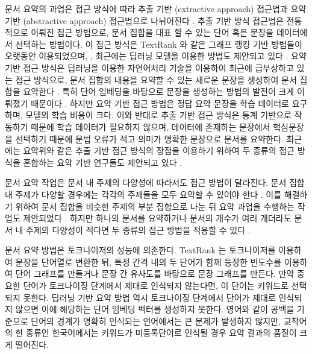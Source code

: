\documentclass[oneside, ko,phd]{snuthesis_utf8_kor}
\begin{document}
문서 요약의 과업은 접근 방식에 따라 추출 기반 (extractive approach) 접근법과 요약 기반 (abstractive approach) 접근법으로 나뉘어진다 \cite{yao2017recent}.
추출 기반 방식 접근법은 전통적으로 이뤄진 접근 방법으로, 문서 집합을 대표 할 수 있는 단어 혹은 문장을 데이터에서 선택하는 방법이다.
이 접근 방식은 TextRank \cite{mihalcea2004textrank} 와 같은 그래프 랭킹 기반 방법들이 오랫동안 이용되었으며,  \cite{parveen2015topical, narayan2018ranking}, 최근에는 딥러닝 모델을 이용한 방법도 제안되고 있다 \cite{rush2015neural}.
요약 기반 접근 방식은 딥러닝을 이용한 자연어처리 기술을 이용하여 최근에 급부상하고 있는 접근 방식으로, 문서 집합의 내용을 요약할 수 있는 새로운 문장을 생성하여 문서 집합을 요약한다 \cite{nallapati2016abstractive}.
특히 단어 임베딩을 바탕으로 문장을 생성하는 방법의 발전이 크게 이뤄졌기 때문이다 \cite{bengio2003neural, donahue2015long, xu2015show, nallapati2016abstractive}.
하지만 요약 기반 접근 방법은 정답 요약 문장을 학습 데이터로 요구하며, 모델의 학습 비용이 크다.
이와 반대로 추출 기반 접근 방식은 통계 기반으로 작동하기 때문에 학습 데이터가 필요하지 않으며, 데이터에 존재하는 문장에서 핵심문장을 선택하기 때문에 문법 오류가 적고 의미가 명확한 문장으로 문서를 요약한다.
최근에는 요약위와 같은 추출 기반 접근 방식의 장점을 이용하기 위하여 두 종류의 접근 방식을 혼합하는 요약 기반 연구들도 제안되고 있다 \cite{banerjee2015multi, bing2015abstractive, gu2016incorporating}.

문서 요약 작업은 문서 내 주제의 다양성에 따라서도 접근 방법이 달라진다.
문서 집합 내 주제가 다양할 경우에는 각각의 주제들을 모두 요약할 수 있어야 한다 \cite{yao2017recent}.
이를 해결하기 위하여 문서 집합을 비슷한 주제의 부분 집합으로 나눈 뒤 요약 과업을 수행하는 작업도 제안되었다 \cite{filippova2008sentence, filippova2010multi}.
하지만 하나의 문서를 요약하거나 문서의 개수가 여러 개더라도 문서 내 주제의 다양성이 적다면 두 종류의 접근 방법을 적용할 수 있다 \cite{goldstein2000multi, lin2002single}.

문서 요약 방법은 토크나이저의 성능에 의존한다.
TextRank 는 토크나이저를 이용하여 문장을 단어열로 변환한 뒤, 특정 간격 내의 두 단어가 함께 등장한 빈도수를 이용하여 단어 그래프를 만들거나 문장 간 유사도를 바탕으로 문장 그래프를 만든다.
만약 중요한 단어가 토크나이징 단계에서 제대로 인식되지 않는다면, 이 단어는 키워드로 선택되지 못한다.
딥러닝 기반 요약 방법 역시 토크나이징 단계에서 단어가 제대로 인식되지 않으면 이에 해당하는 단어 임베딩 벡터를 생성하지 못한다.
영어와 같이 공백을 기준으로 단어의 경계가 명확히 인식되는 언어에서는 큰 문제가 발생하지 않지만, 교착어의 한 종류인 한국어에서는 키워드가 미등록단어로 인식될 경우 요약 결과의 품질이 크게 떨어진다.
\end{document}
